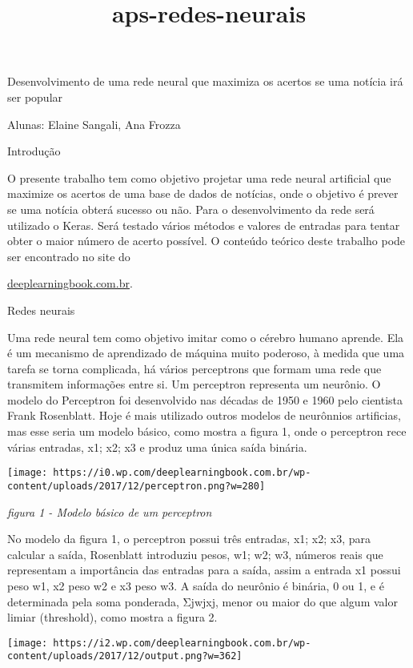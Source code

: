 \documentclass[11pt]{article}
\title{aps-redes-neurais}
\makeatletter
\def\maxwidth{\ifdim\Gin@nat@width>\linewidth\linewidth
    \else\Gin@nat@width\fi}
\let\Oldincludegraphics\includegraphics
\renewcommand{\includegraphics}[1]{\Oldincludegraphics[width=.8\maxwidth]{#1}}
\makeatother
\begin{document}
    
    
    \maketitle
    
    

    
    Desenvolvimento de uma rede neural que maximiza os acertos se uma
notícia irá ser popular

Alunas: Elaine Sangali, Ana Frozza

    Introdução

O presente trabalho tem como objetivo projetar uma rede neural
artificial que maximize os acertos de uma base de dados de notícias,
onde o objetivo é prever se uma notícia obterá sucesso ou não. Para o
desenvolvimento da rede será utilizado o Keras. Será testado vários
métodos e valores de entradas para tentar obter o maior número de acerto
possível. O conteúdo teórico deste trabalho pode ser encontrado no site
do

\href{http://deeplearningbook.com.br/capitulos/}{deeplearningbook.com.br}.

Redes neurais

Uma rede neural tem como objetivo imitar como o cérebro humano aprende.
Ela é um mecanismo de aprendizado de máquina muito poderoso, à medida
que uma tarefa se torna complicada, há vários perceptrons que formam uma
rede que transmitem informações entre si. Um perceptron representa um
neurônio. O modelo do Perceptron foi desenvolvido nas décadas de 1950 e
1960 pelo cientista Frank Rosenblatt. Hoje é mais utilizado outros
modelos de neurônnios artificias, mas esse seria um modelo básico, como
mostra a figura 1, onde o perceptron rece várias entradas, x1; x2; x3 e
produz uma única saída binária.

\texttt{[image: https://i0.wp.com/deeplearningbook.com.br/wp-content/uploads/2017/12/perceptron.png?w=280]}

\emph{figura 1 - Modelo básico de um perceptron}

No modelo da figura 1, o perceptron possui três entradas, x1; x2; x3,
para calcular a saída, Rosenblatt introduziu pesos, w1; w2; w3, números
reais que representam a importância das entradas para a saída, assim a
entrada x1 possui peso w1, x2 peso w2 e x3 peso w3. A saída do neurônio
é binária, 0 ou 1, e é determinada pela soma ponderada, Σjwjxj, menor ou
maior do que algum valor limiar (threshold), como mostra a figura 2.

\texttt{[image: https://i2.wp.com/deeplearningbook.com.br/wp-content/uploads/2017/12/output.png?w=362]}
\end{document}
